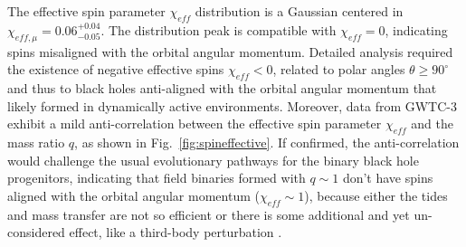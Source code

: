 \documentclass[a4paper,titlepage]{book}     	%
\begin{document}
The effective spin parameter $\chi_{eff}$ distribution is a Gaussian centered in $\chi_{eff, \mu} = 0.06_{-0.05}^{+0.04}$. The distribution peak is compatible with $\chi_{eff} = 0$, indicating spins misaligned with the orbital angular momentum. Detailed analysis required the existence of negative effective spins $\chi_{eff} < 0$, related to polar angles $\theta \geq 90^\circ $ and thus to black holes anti-aligned with the orbital angular momentum that likely formed in dynamically active environments. Moreover, data from GWTC-3 exhibit a mild anti-correlation between the effective spin parameter $\chi_{eff}$ and the mass ratio $q$, as shown in Fig.\ \ref{fig:spineffective}. If confirmed, the anti-correlation would challenge the usual evolutionary pathways for the binary black hole progenitors, indicating that field binaries formed with $q \sim 1$ don't have spins aligned with the orbital angular momentum ($\chi_{eff} \sim 1$),  because either the tides and mass transfer are not so efficient or there is some additional and yet un-considered effect, like a third-body perturbation \cite{misalignedbinary}. 
\end{document}
